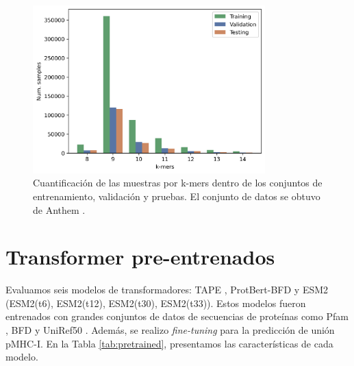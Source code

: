 \begin{figure}[]
	\centering\includegraphics[width=0.8\textwidth]{img/proposal/dataset_samples}
	\caption{
		Cuantificación de las muestras por k-mers dentro de los conjuntos de entrenamiento, validación y pruebas. El conjunto de datos se obtuvo de Anthem \cite{mei2021anthem}.}
	\label{fig:samples}
\end{figure}


\section{Transformer pre-entrenados}

Evaluamos seis modelos de transformadores: TAPE \citep{rao2019evaluating}, ProtBert-BFD \citep{elnaggar2021prottrans} y ESM2 \citep{lin2023evolutionary} (ESM2(t6), ESM2(t12), ESM2(t30), ESM2(t33)). Estos modelos fueron entrenados con grandes conjuntos de datos de secuencias de proteínas como Pfam \citep{el2019pfam},  BFD y UniRef50 \citep{suzek2015uniref}. Además, se realizo \textit{fine-tuning } para la predicción de unión pMHC-I. En la Tabla \ref{tab:pretrained}, presentamos las características de cada modelo.

